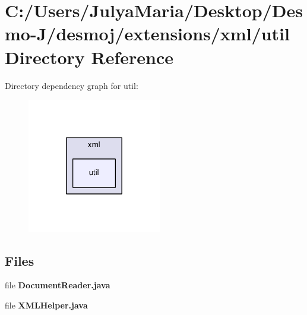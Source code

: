 \section{C\-:/\-Users/\-Julya\-Maria/\-Desktop/\-Desmo-\/\-J/desmoj/extensions/xml/util Directory Reference}
\label{dir_78416af2a38e03e4d542628a972b54be}
Directory dependency graph for util\-:
\nopagebreak
\begin{figure}[H]
\begin{center}
\leavevmode
\includegraphics[width=166pt]{dir_78416af2a38e03e4d542628a972b54be_dep}
\end{center}
\end{figure}
\subsection*{Files}
\begin{DoxyCompactItemize}
\item 
file {\bfseries Document\-Reader.\-java}
\item 
file {\bfseries X\-M\-L\-Helper.\-java}
\end{DoxyCompactItemize}
